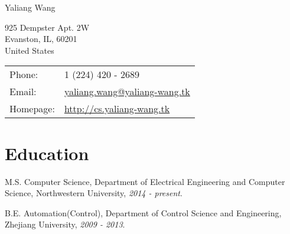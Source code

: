 \documentclass[letterpaper]{article}
\def\name{Yaliang Wang}
\renewenvironment{itemize}{
  \begin{list}{}{
    \setlength{\leftmargin}{1.5em}
  }
}{
  \end{list}
}
\begin{document}
{\huge \name}


\vspace{0.25in}

\begin{minipage}{0.45\linewidth}
  925 Dempster Apt. 2W \\
  Evanston, IL, 60201 \\
  United States 
  
\end{minipage}
\begin{minipage}{0.45\linewidth}
  \begin{tabular}{ll}
    Phone: & 1 (224) 420 - 2689 \\
    Email: & \href{mailto:yaliang.wang@yaliang-wang.tk}{yaliang.wang@yaliang-wang.tk} \\
    Homepage: & \href{http://cs.yaliang-wang.tk}{http://cs.yaliang-wang.tk} \\
  \end{tabular}
\end{minipage}


%

%

\section*{Education}

\begin{itemize}
  \item M.S. Computer Science, Department of Electrical Engineering and Computer Science, Northwestern University, {\it 2014 - present}.
  \item B.E. Automation(Control), Department of Control Science and Engineering, Zhejiang University, {\it 2009 - 2013}.
\end{itemize}
\end{document}
